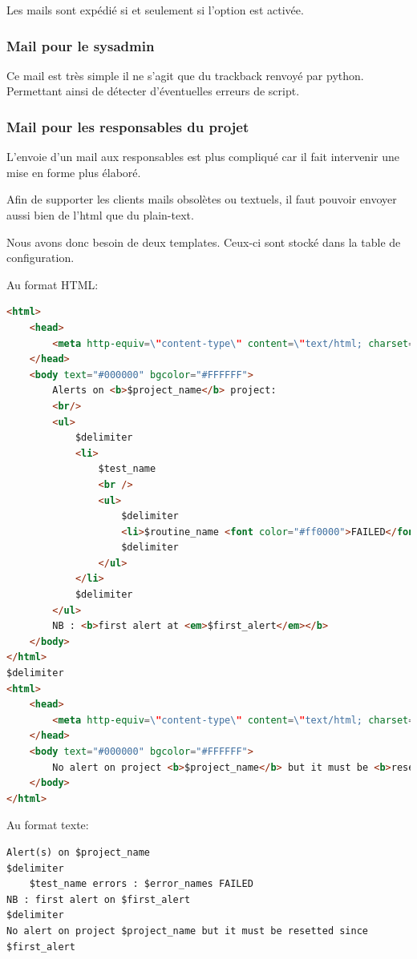 Les mails sont expédié si et seulement si l'option est activée.

\subsubsection*{Mail pour le sysadmin}

Ce mail est très simple il ne s'agit que du trackback renvoyé par python. Permettant ainsi de détecter d'éventuelles erreurs de script.

\subsubsection*{Mail pour les responsables du projet}

L'envoie d'un mail aux responsables est plus compliqué car il fait intervenir une mise en forme plus élaboré.

Afin de supporter les clients mails obsolètes ou textuels, il faut pouvoir envoyer aussi bien de l'html que du plain-text.

Nous avons donc besoin de deux templates. Ceux-ci sont stocké dans la table de configuration.

Au format HTML:

\begin{lstlisting}[language=HTML]
<html>
    <head>
        <meta http-equiv=\"content-type\" content=\"text/html; charset=ISO-8859-1\">
    </head>
    <body text="#000000" bgcolor="#FFFFFF">
        Alerts on <b>$project_name</b> project:
        <br/>
        <ul>
            $delimiter
            <li>
                $test_name
                <br />
                <ul>
                    $delimiter
                    <li>$routine_name <font color="#ff0000">FAILED</font></li>
                    $delimiter
                </ul>
            </li>
            $delimiter
        </ul>
        NB : <b>first alert at <em>$first_alert</em></b>
    </body>
</html>
$delimiter
<html>
    <head>
        <meta http-equiv=\"content-type\" content=\"text/html; charset=ISO-8859-1\">
    </head>
    <body text="#000000" bgcolor="#FFFFFF">
        No alert on project <b>$project_name</b> but it must be <b>resetted</b> since <b>$first_alert</b> 
    </body>
</html>
\end{lstlisting}

\newpage

Au format texte:

\begin{lstlisting}
Alert(s) on $project_name
$delimiter
    $test_name errors : $error_names FAILED
NB : first alert on $first_alert
$delimiter
No alert on project $project_name but it must be resetted since $first_alert 
\end{lstlisting}

